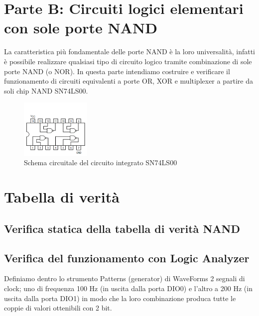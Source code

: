 \documentclass[10pt, a4paper, italian]{article}
\begin{document}
\setcounter{section}{3}
\section*{Parte B: Circuiti logici elementari con sole porte NAND}
La caratteristica più fondamentale delle porte NAND è la loro universalità,
infatti è possibile realizzare qualsiasi tipo di circuito logico tramite
combinazione di sole porte NAND (o NOR). In questa parte intendiamo costruire
e verificare il funzionamento di circuiti equivalenti a porte OR, XOR e
multiplexer a partire da soli chip NAND SN74LS00.
\begin{figure}[htbp]
\centering
    \includegraphics[width=0.3\textwidth]{NAND}
    \caption{Schema circuitale del circuito integrato SN74LS00
    \label{fig: NAND}}
\end{figure}

\section{Tabella di verità}
\subsection{Verifica statica della tabella di verità NAND}

\subsection{Verifica del funzionamento con Logic Analyzer}
Definiamo dentro lo strumento Patterns (generator) di WaveForms 2 segnali
di clock; uno di frequenza 100 Hz (in uscita dalla porta DIO0) e l'altro a
200 Hz (in uscita dalla porta DIO1) in modo che la loro combinazione produca
tutte le coppie di valori ottenibili con 2 bit.
\end{document}
